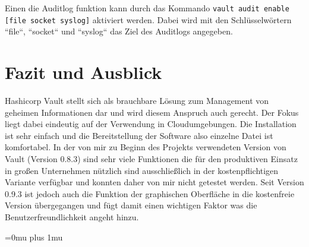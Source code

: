 \documentclass[
book,
a4paper,   
titlepage,  
halfparskip,
12pt        
]{scrartcl}
\newcommand\inline{\lstinline[basicstyle=\ttfamily]}
\begin{document}
\begin{onehalfspacing}
Einen die Auditlog funktion kann durch das Kommando \inline|vault audit enable [file socket syslog]| aktiviert werden. Dabei wird mit den Schlüsselwörtern ``file``, ``socket`` und ``syslog`` das Ziel des Auditlogs angegeben.
 
\newpage
\section{Fazit und Ausblick}
\label{sec:ausblick}

Hashicorp Vault stellt sich als brauchbare Lösung zum Management von geheimen Informationen dar und wird diesem Anspruch auch gerecht. Der Fokus liegt dabei eindeutig auf der Verwendung in Cloudumgebungen. Die Installation ist sehr einfach und die Bereitstellung der Software also einzelne Datei ist komfortabel. In der von mir zu Beginn des Projekts verwendeten Version von Vault (Version 0.8.3) sind sehr viele Funktionen die für den produktiven Einsatz in großen Unternehmen nützlich sind ausschließlich in der kostenpflichtigen Variante verfügbar und konnten daher von mir nicht getestet werden. Seit Version 0.9.3 ist jedoch auch die Funktion der graphischen Oberfläche in die kostenfreie Version übergegangen und fügt damit einen wichtigen Faktor was die Benutzerfreundlichkeit angeht hinzu.\newline
  




\newpage
\appendix
\Urlmuskip=0mu plus 1mu



\end{onehalfspacing}
\end{document}
